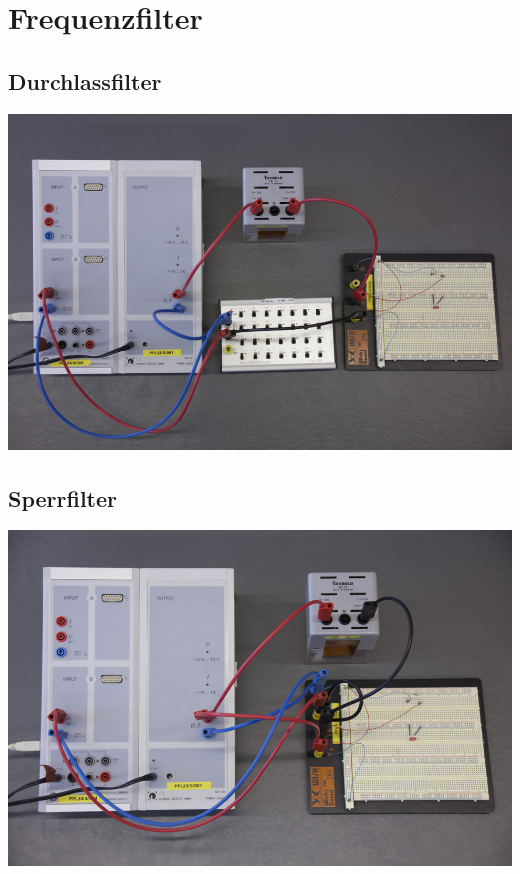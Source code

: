 \section{Frequenzfilter}
\subsection*{Durchlassfilter}
\begin{frame}
	\includegraphics[width=\textwidth]{images/1/durchlassfilter}
\end{frame}
\subsection*{Sperrfilter}
\begin{frame}
	\includegraphics[width=\textwidth]{images/1/sperrfilter}
\end{frame}
